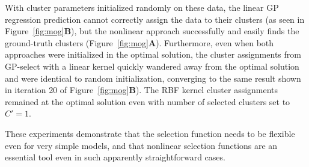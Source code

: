 With cluster parameters initialized randomly on these data, the linear GP regression prediction cannot correctly assign the data to their clusters (as seen in Figure~\ref{fig:mog}\textbf{B}), but the nonlinear approach successfully and easily finds the ground-truth clusters (Figure~\ref{fig:mog}\textbf{A}).
Furthermore, even when both approaches were initialized in the optimal solution, the cluster assignments from GP-select with a linear kernel quickly wandered away from the optimal solution and were identical to random initialization, converging to the same result shown in iteration 20 of Figure~\ref{fig:mog}\textbf{B}).
The RBF kernel cluster assignments remained at the optimal solution even with number of selected clusters set to $C'=1$.


These experiments demonstrate that the selection function needs to be flexible even
for very simple models, and that nonlinear selection functions are an essential tool
even in such apparently straightforward cases.





%

